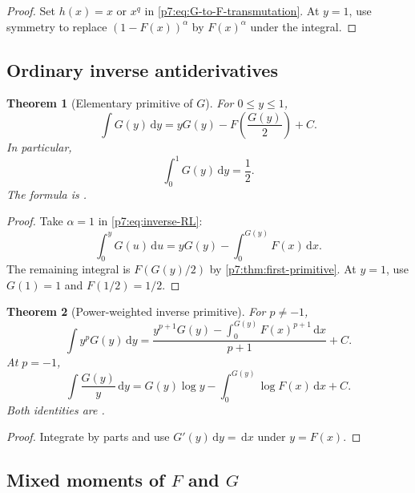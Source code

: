 \documentclass[11pt,oneside]{article}
\newtheorem{theorem}{Theorem}[section]
\theoremstyle{definition}
\theoremstyle{remark}
\newcommand{\dd}{\,\mathrm d}
\newcommand{\1}{\mathbf 1}
\begin{document}
\begin{proof}
Set $h(x)=x$ or $x^q$ in \cref{p7:eq:G-to-F-transmutation}.  At $y=1$, use symmetry to
replace $(1-F(x))^\alpha$ by $F(x)^\alpha$ under the integral.
\end{proof}

\subsection{Ordinary inverse antiderivatives}

\begin{theorem}[Elementary primitive of $G$]
\label{p7:thm:inverse-primitive}
For $0\le y\le1$,
\begin{equation}
 \boxed{\int G(y)\dd y
 =yG(y)-F\!\left(\frac{G(y)}2\right)+C.}
 \label{p7:eq:inverse-primitive}
\end{equation}
In particular,
\begin{equation}
 \int_0^1G(y)\dd y=\frac12.
 \label{p7:eq:inverse-mean}
\end{equation}
The formula is \statusproved.
\end{theorem}

\begin{proof}
Take $\alpha=1$ in \cref{p7:eq:inverse-RL}:
\[
 \int_0^yG(u)\dd u=yG(y)-\int_0^{G(y)}F(x)\dd x.
\]
The remaining integral is $F(G(y)/2)$ by \cref{p7:thm:first-primitive}.  At $y=1$, use
$G(1)=1$ and $F(1/2)=1/2$.
\end{proof}

\begin{theorem}[Power-weighted inverse primitive]
\label{p7:thm:weighted-inverse}
For $p\ne-1$,
\begin{equation}
 \int y^pG(y)\dd y
 =\frac{y^{p+1}G(y)-\displaystyle\int_0^{G(y)}F(x)^{p+1}\dd x}{p+1}+C.
 \label{p7:eq:weighted-inverse}
\end{equation}
At $p=-1$,
\begin{equation}
 \int\frac{G(y)}y\dd y
 =G(y)\log y-\int_0^{G(y)}\log F(x)\dd x+C.
 \label{p7:eq:log-weight-inverse}
\end{equation}
Both identities are \statusproved.
\end{theorem}

\begin{proof}
Integrate by parts and use $G'(y)\dd y=\dd x$ under $y=F(x)$.
\end{proof}

\subsection{Mixed moments of $F$ and $G$}
\end{document}
